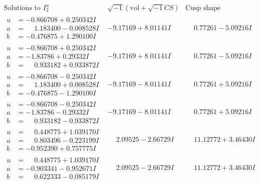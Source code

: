 \documentclass[1p]{elsarticle_modified}
\theoremstyle{definition}
\newcommand{\I}{\sqrt{-1}}
\begin{document}
$$\begin{array}{c|c|c}  
\text{Solutions to }I^u_{2}& \I (\text{vol} + \sqrt{-1}CS) & \text{Cusp shape}\\
 \hline 
\begin{aligned}
u &= -0.866708 + 0.250342 I \\
a &= \phantom{-}1.183400 - 0.008528 I \\
b &= -0.476875 + 1.290100 I\end{aligned}
 & -9.17169 + 8.01141 I & \phantom{-}0.77261 - 5.09216 I \\ \hline\begin{aligned}
u &= -0.866708 + 0.250342 I \\
a &= -1.83786 + 0.29332 I \\
b &= \phantom{-}0.933182 + 0.933872 I\end{aligned}
 & -9.17169 + 8.01141 I & \phantom{-}0.77261 - 5.09216 I \\ \hline\begin{aligned}
u &= -0.866708 - 0.250342 I \\
a &= \phantom{-}1.183400 + 0.008528 I \\
b &= -0.476875 - 1.290100 I\end{aligned}
 & -9.17169 - 8.01141 I & \phantom{-}0.77261 + 5.09216 I \\ \hline\begin{aligned}
u &= -0.866708 - 0.250342 I \\
a &= -1.83786 - 0.29332 I \\
b &= \phantom{-}0.933182 - 0.933872 I\end{aligned}
 & -9.17169 - 8.01141 I & \phantom{-}0.77261 + 5.09216 I \\ \hline\begin{aligned}
u &= \phantom{-}0.448775 + 1.039170 I \\
a &= \phantom{-}0.803496 - 0.223199 I \\
b &= -0.952390 + 0.757775 I\end{aligned}
 & \phantom{-}2.09525 - 2.66729 I & \phantom{-}11.12772 + 3.46430 I \\ \hline\begin{aligned}
u &= \phantom{-}0.448775 + 1.039170 I \\
a &= -0.903341 - 0.952671 I \\
b &= \phantom{-}0.622333 - 0.085179 I\end{aligned}
 & \phantom{-}2.09525 - 2.66729 I & \phantom{-}11.12772 + 3.46430 I \\ \hline\begin{aligned}

\end{aligned}
\end{array}$$
\end{document}
